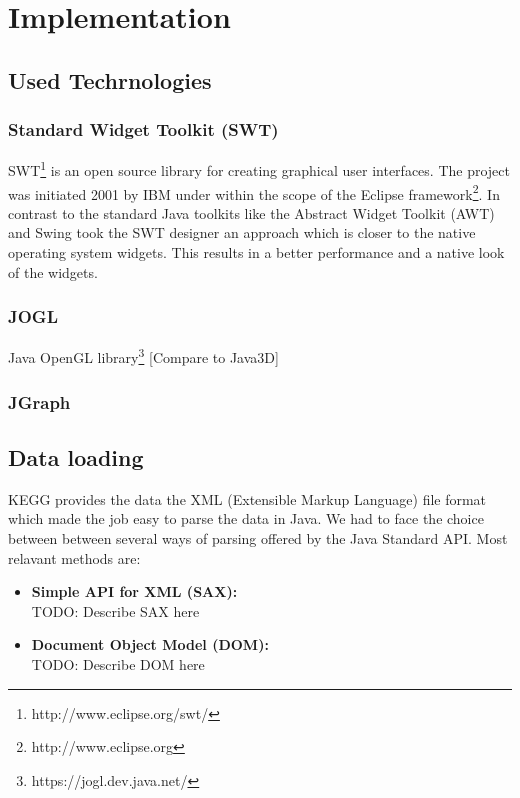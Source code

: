 \chapter{Implementation}

\section{Used Techrnologies}
\subsection{Standard Widget Toolkit (SWT)}

SWT\footnote{http://www.eclipse.org/swt/} is an open source library for creating graphical user interfaces. The project was initiated 2001 by IBM under within the scope of the Eclipse framework\footnote{http://www.eclipse.org}. In contrast to the standard Java toolkits like the Abstract Widget Toolkit (AWT) and Swing took the SWT designer an approach which is closer to the native operating system widgets. This results in a better performance and a native look of the widgets.

\subsection{JOGL}

Java OpenGL library\footnote{https://jogl.dev.java.net/}
[Compare to Java3D]

\subsection{JGraph}

\section{Data loading}

KEGG provides the data the XML (Extensible Markup Language) file format which made the job easy to parse the data in Java. We had to face the choice between between several ways of parsing offered by the Java Standard API. 
Most relavant methods are\cite{Niemeyer2002}:
\begin{itemize}
 \item \textbf{Simple API for XML (SAX):}\\
  TODO: Describe SAX here
 \item \textbf{Document Object Model (DOM):}\\
  TODO: Describe DOM here
\end{itemize}

